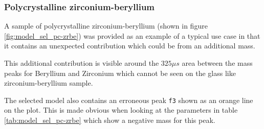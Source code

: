 \documentclass[a4paper]{article}
\begin{document}
\subsubsection{Polycrystalline zirconium-beryllium}

A sample of polycrystalline zirconium-beryllium (shown in figure
\ref{fig:model_sel_pc-zrbe}) was provided as an example of a typical use case in
that it contains an unexpected contribution which could be from an additional
mass.

This additional contribution is visible around the $325 \mu s$ area between the
mass peaks for Beryllium and Zirconium which cannot be seen on the glass like
zirconium-beryllium sample.

The selected model also contains an erroneous peak \texttt{f3} shown as an
orange line on the plot. This is made obvious when looking at the parameters in
table \ref{tab:model_sel_pc-zrbe} which show a negative mass for this peak.
\end{document}
